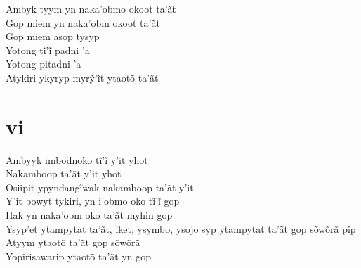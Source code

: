 \bigskip

\begin{linenumbers}
 
\noindent   Ambyk tyym yn naka'obmo okoot ta'ãt\\
  Gop miem yn naka'obm okoot ta'ãt\\
  Gop miem asop tysyp\\
  Yotong tĩ’ĩ padni ’a\\
  Yotong pitadni 'a\\
  Atykiri ykyryp myrỹ’ĩt ytaotõ ta’ãt
 
 
 \medskip
\section{vi}

  \noindent Ambyyk imbodnoko tĩ’ĩ y’it yhot\\
  Nakamboop ta'ãt y'it yhot\\
  Osiipit ypyndangĩwak nakamboop ta’ãt y’it\\
  Y’it bowyt tykiri, yn i’obmo oko tĩ’ĩ gop\\
  Hak yn naka'obm oko ta'ãt myhin gop\\
  Ysyp'et ytampytat ta'ãt, iket, ysymbo, ysojo syp ytampytat ta'ãt gop sõwõrã pip\\
  Atyym ytaotõ ta'ãt gop sõwõrã\\
  Yopirisawarip ytaotõ ta'ãt yn gop
 
\end{linenumbers}

